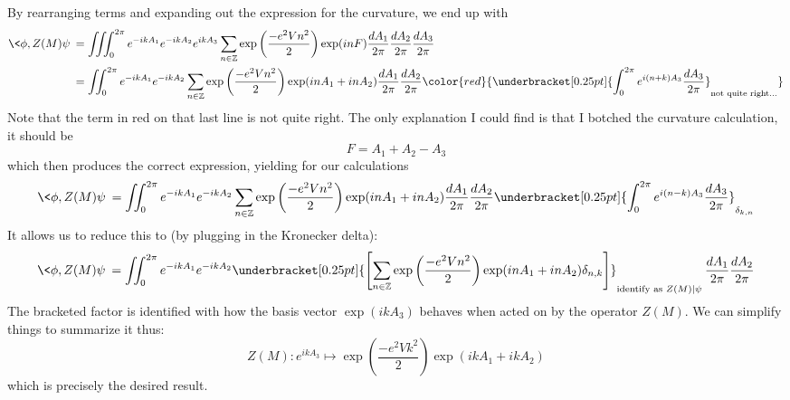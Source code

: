 \documentclass{amsart}
\numberwithin{equation}{section}
\begin{document}
By rearranging terms and expanding out the expression for the
curvature, we end up with
\begin{align*}
\<\phi,Z(M)\psi\> &= \iiint^{2\pi}_{0}e^{-ikA_{1}}e^{-ikA_{2}}e^{ikA_{3}}\sum_{n\in\mathbb{Z}}\exp\left(\frac{-e^{2}Vn^{2}}{2}\right)\exp(inF)\frac{dA_{1}}{2\pi}\frac{dA_{2}}{2\pi}\frac{dA_{3}}{2\pi}\\
&=\iint^{2\pi}_{0}e^{-ikA_{1}}e^{-ikA_{2}}\sum_{n\in\mathbb{Z}}\exp\left(\frac{-e^{2}Vn^{2}}{2}\right)\exp(inA_{1}+inA_{2})\frac{dA_{1}}{2\pi}\frac{dA_{2}}{2\pi}\color{red}{\underbracket[0.25pt]{\int^{2\pi}_{0}e^{i(n+k)A_{3}}\frac{dA_{3}}{2\pi}}_{\text{not quite right...}}}
\end{align*}
Note that the term in red on that last line is not quite
right. The only explanation I could find is that I botched the
curvature calculation, it should be
\begin{equation}%
F = A_{1}+A_{2}-A_{3}
\end{equation}
which then produces the correct expression, yielding for our calculations
\begin{equation}%
\<\phi,Z(M)\psi\> = \iint^{2\pi}_{0}e^{-ikA_{1}}e^{-ikA_{2}}\sum_{n\in\mathbb{Z}}\exp\left(\frac{-e^{2}Vn^{2}}{2}\right)\exp(inA_{1}+inA_{2})\frac{dA_{1}}{2\pi}\frac{dA_{2}}{2\pi}\underbracket[0.25pt]{\int^{2\pi}_{0}e^{i(n-k)A_{3}}\frac{dA_{3}}{2\pi}}_{\delta_{k,n}}
\end{equation}
It allows us to reduce this to (by plugging  in the Kronecker
delta):
\begin{equation}%
\<\phi,Z(M)\psi\> =
\iint^{2\pi}_{0}e^{-ikA_{1}}e^{-ikA_{2}}\underbracket[0.25pt]{\left[\sum_{n\in\mathbb{Z}}\exp\left(\frac{-e^{2}Vn^{2}}{2}\right)\exp(inA_{1}+inA_{2})\delta_{n,k}\right]}_{\text{identify as }Z(M)|\psi\>}\frac{dA_{1}}{2\pi}\frac{dA_{2}}{2\pi}
\end{equation}
The bracketed factor is identified with how the basis vector
$\exp(ikA_{3})$ behaves when acted on by the operator $Z(M)$. We
can simplify things to summarize it thus:
\begin{equation}%
Z(M):e^{ikA_{3}}\mapsto \exp\left(\frac{-e^{2}Vk^{2}}{2}\right)\exp(ikA_{1}+ikA_{2})
\end{equation}
which is precisely the desired result.
\nocite{*}


\end{document}
